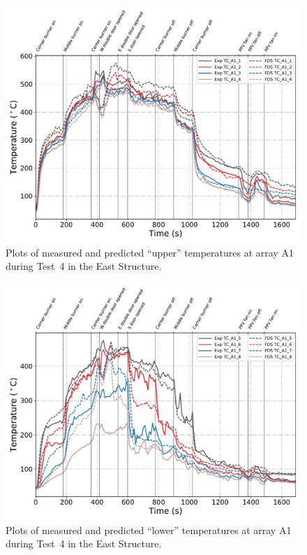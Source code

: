 \clearpage
\begin{figure}[p]
	\centering
	\includegraphics[width=\columnwidth]{Figures/Plots/Validation/Temperature/Test_4_TC_A1_upper}
	\caption{Plots of measured and predicted ``upper'' temperatures at array A1 during Test~4 in the East Structure.}
	\label{fig:TCA1_upper_data_Test4}
\end{figure}
\begin{figure}[p]
	\centering
	\includegraphics[width=\columnwidth]{Figures/Plots/Validation/Temperature/Test_4_TC_A1_lower}
	\caption{Plots of measured and predicted ``lower'' temperatures at array A1 during Test~4 in the East Structure.}
	\label{fig:TCA1_lower_data_Test4}
\end{figure}

